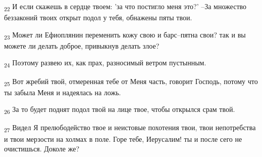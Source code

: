 \begin{tcolorbox}
\textsubscript{22} И если скажешь в сердце твоем: 'за что постигло меня это?' --За множество беззаконий твоих открыт подол у тебя, обнажены пяты твои.
\end{tcolorbox}
\begin{tcolorbox}
\textsubscript{23} Может ли Ефиоплянин переменить кожу свою и барс--пятна свои? так и вы можете ли делать доброе, привыкнув делать злое?
\end{tcolorbox}
\begin{tcolorbox}
\textsubscript{24} Поэтому развею их, как прах, разносимый ветром пустынным.
\end{tcolorbox}
\begin{tcolorbox}
\textsubscript{25} Вот жребий твой, отмеренная тебе от Меня часть, говорит Господь, потому что ты забыла Меня и надеялась на ложь.
\end{tcolorbox}
\begin{tcolorbox}
\textsubscript{26} За то будет поднят подол твой на лице твое, чтобы открылся срам твой.
\end{tcolorbox}
\begin{tcolorbox}
\textsubscript{27} Видел Я прелюбодейство твое и неистовые похотения твои, твои непотребства и твои мерзости на холмах в поле. Горе тебе, Иерусалим! ты и после сего не очистишься. Доколе же?
\end{tcolorbox}
